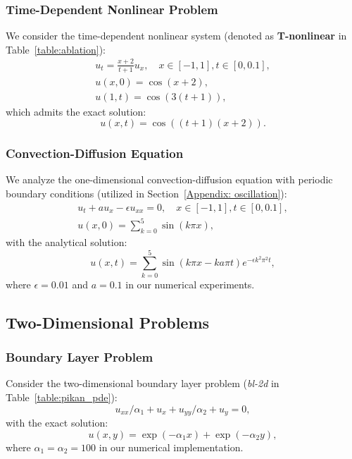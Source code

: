 \subsubsection{Time-Dependent Nonlinear Problem}
We consider the time-dependent nonlinear system (denoted as \textbf{T-nonlinear} in Table~\ref{table:ablation}):
\begin{equation}\label{eq:tnonlinear}
\begin{gathered}
     u_t=\frac{x+2}{t+1}u_x, \quad x\in [-1,1], t \in [0,0.1],\\
     u(x,0)=\cos(x+2),\\
     u(1,t)=\cos(3(t+1)),
\end{gathered}
\end{equation}
which admits the exact solution:
\begin{equation}
    u(x,t)=\cos((t+1)(x+2)).
\end{equation}

\subsubsection{Convection-Diffusion Equation}
We analyze the one-dimensional convection-diffusion equation with periodic boundary conditions (utilized in Section~\ref{Appendix: oscillation}):
\begin{equation}\label{eq:cd}
\begin{gathered}
    u_t+au_x-\epsilon u_{xx}=0, \quad x\in [-1,1], t \in [0,0.1],\\
    u(x,0)=\sum_{k=0}^{5} \sin(k\pi x),
\end{gathered}
\end{equation}
with the analytical solution:
\begin{equation}
    u(x,t)=\sum_{k=0}^{5} \sin(k\pi x - ka\pi t)e^{-\epsilon k^2\pi^2 t},
\end{equation}
where $\epsilon=0.01$ and $a=0.1$ in our numerical experiments.

\subsection{Two-Dimensional Problems}
\subsubsection{Boundary Layer Problem}
Consider the two-dimensional boundary layer problem (\textit{bl-2d} in Table~\ref{table:pikan_pde}):
\begin{equation}\label{eq:bl2d}
u_{xx}/\alpha_1+u_{x}+u_{yy}/\alpha_2+u_{y}=0,
\end{equation}
with the exact solution:
\begin{equation}
   u(x,y)=\exp(-\alpha_1 x)+\exp(-\alpha_2 y),
\end{equation}
where $\alpha_1=\alpha_2=100$ in our numerical implementation.

